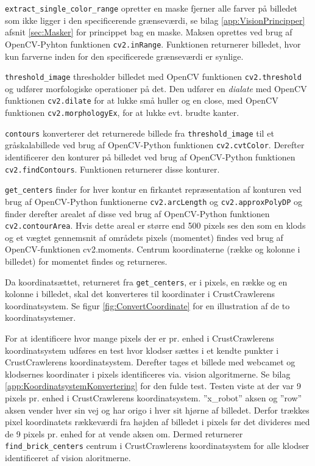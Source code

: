\texttt{extract\_single\_color\_range} opretter en maske fjerner alle farver på billedet som ikke ligger i den specificerende grænseværdi, se bilag \ref{app:VisionPrincipper} afsnit \vref{sec:Masker} for princippet bag en maske.
Maksen oprettes ved brug af OpenCV-Pyhton funktionen \texttt{cv2.inRange}.
Funktionen returnerer billedet, hvor kun farverne inden for den specificerede grænseværdi er synlige.

\texttt{threshold\_image} thresholder billedet med OpenCV funktionen \texttt{cv2.threshold} og udfører morfologiske operationer på det.
Den udfører en \textit{dialate} med OpenCV funktionen \texttt{cv2.dilate} for at lukke små huller og en close, med OpenCV funktionen \texttt{cv2.morphologyEx}, for at lukke evt. brudte kanter.

\texttt{contours} konverterer det returnerede billede fra \texttt{threshold\_image} til et gråskalabillede ved brug af OpenCV-Python funktionen \texttt{cv2.cvtColor}.
Derefter identificerer den konturer på billedet ved brug af OpenCV-Python funktionen \texttt{cv2.findContours}.
Funktionen returnerer disse konturer.

\texttt{get\_centers} finder for hver kontur en firkantet repræsentation af konturen ved brug af OpenCV-Python funktionerne \texttt{cv2.arcLength} og \texttt{cv2.approxPolyDP} og finder derefter arealet af disse ved brug af OpenCV-Python funktionen \texttt{cv2.contourArea}.
Hvis dette areal er større end 500 pixels ses den som en klods og et vægtet gennemsnit af områdets pixels (momentet) findes ved brug af OpenCV-funktionen cv2.moments.
Centrum koordinaterne (række og kolonne i billedet) for momentet findes og returneres. 

Da koordinatsættet, returneret fra \texttt{get\_centers}, er i pixels, en række og en kolonne i billedet, skal det konverteres til koordinater i CrustCrawlerens koordinatsystem.
Se figur \vref{fig:ConvertCoordinate} for en illustration af de to koordinatsystemer.


For at identificere hvor mange pixels der er pr. enhed i CrustCrawlerens koordinatsystem udføres en test hvor klodser sættes i et kendte punkter i CrustCrawlerens koordinatsystem.
Derefter tages et billede med webcamet og klodsernes koordinater i pixels identificeres via. vision algoritmerne.
Se bilag \vref{app:KoordinatsystemKonvertering} for den fulde test.
Testen viste at der var 9 pixels pr. enhed i CrustCrawlerens koordinatsystem.
''x\_robot'' aksen og ''row'' aksen vender hver sin vej og har origo i hver sit hjørne af billedet.
Derfor trækkes pixel koordinatets rækkeværdi fra højden af billedet i pixels før det divideres med de 9 pixels pr. enhed for at vende aksen om.
Dermed returnerer \texttt{find\_brick\_centers} centrum i CrustCrawlerens koordinatsystem for alle klodser identificeret af vision aloritmerne.



